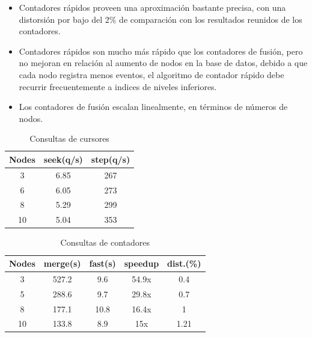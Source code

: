 \documentclass[12pt,legalpaper]{report}
\begin{document}
\begin{itemize}
		\begin{itemize}
			\item Contadores rápidos proveen una aproximación bastante precisa, con una distorsión por bajo del 2\% de comparación con los resultados reunidos de los contadores.

			\item Contadores rápidos son mucho más rápido que los contadores de fusión, pero no mejoran en relación al aumento de nodos en la base de datos, debido a que cada nodo registra menos eventos, el algoritmo de contador rápido debe recurrir frecuentemente a indices de niveles inferiores.
 
			\item Los contadores de fusión escalan linealmente, en términos de números de nodos.
		\end{itemize}
\end{itemize}

\begin{table}[!h]
\begin{center}
\begin{tabular}{| c | c | c |}
\hline
\rowcolor[gray]{0.9}Nodes & seek(q/s) & step(q/s)\\
\hline
3 & 6.85 & 267\\
\hline
6 & 6.05 & 273\\
\hline
8 & 5.29 & 299\\
\hline
10 & 5.04 & 353\\
\hline
\end{tabular}
\caption{Consultas de cursores}
\label{cursorQueries}
\end{center}
\end{table}


\begin{table}[!h]
\begin{center}
\begin{tabular}{| c | c | c | c | c |}
\hline
\rowcolor[gray]{0.9}Nodes & merge(s) & fast(s) & speedup & dist.(\%)\\
\hline
3 & 527.2 & 9.6 & 54.9x & 0.4\\
\hline
5 & 288.6 & 9.7 & 29.8x & 0.7\\
\hline
8 & 177.1 & 10.8 & 16.4x & 1\\
\hline
10 & 133.8 & 8.9 & 15x & 1.21\\
\hline
\end{tabular}
\caption{Consultas de contadores}
\label{countQueries}
\end{center}
\end{table}
\end{document}

